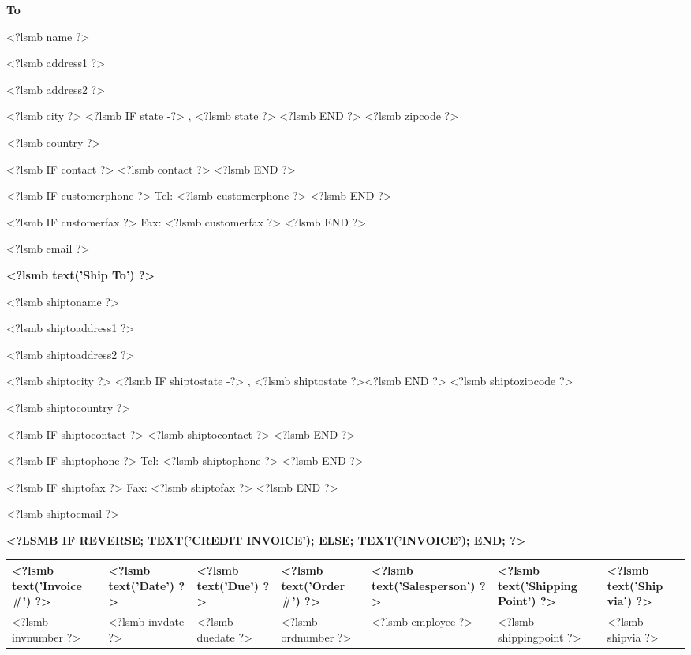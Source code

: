 \parbox[t]{.5\textwidth}{
\textbf{To}
\vspace{0.3cm}

<?lsmb name ?>

<?lsmb address1 ?>

<?lsmb address2 ?>

<?lsmb city ?>
<?lsmb IF state -?>
\hspace{-0.1cm}, <?lsmb state ?> <?lsmb END ?> <?lsmb zipcode ?>

<?lsmb country ?>

\vspace{0.3cm}

<?lsmb IF contact ?>
<?lsmb contact ?>
\vspace{0.2cm}
<?lsmb END ?>

<?lsmb IF customerphone ?>
Tel: <?lsmb customerphone ?>
<?lsmb END ?>

<?lsmb IF customerfax ?>
Fax: <?lsmb customerfax ?>
<?lsmb END ?>

<?lsmb email ?>
}
\parbox[t]{.5\textwidth}{
\textbf{<?lsmb text('Ship To') ?>}
\vspace{0.3cm}

<?lsmb shiptoname ?>

<?lsmb shiptoaddress1 ?>

<?lsmb shiptoaddress2 ?>

<?lsmb shiptocity ?>
<?lsmb IF shiptostate -?>
\hspace{-0.1cm}, <?lsmb shiptostate ?><?lsmb END ?> <?lsmb shiptozipcode ?>

<?lsmb shiptocountry ?>

\vspace{0.3cm}

<?lsmb IF shiptocontact ?>
<?lsmb shiptocontact ?>
\vspace{0.2cm}
<?lsmb END ?>

<?lsmb IF shiptophone ?>
Tel: <?lsmb shiptophone ?>
<?lsmb END ?>

<?lsmb IF shiptofax ?>
Fax: <?lsmb shiptofax ?>
<?lsmb END ?>

<?lsmb shiptoemail ?>
}
\hfill

\vspace{1cm}

\textbf{\MakeUppercase{<?lsmb
    IF reverse;
       text('Credit Invoice');
    ELSE;
       text('Invoice');
    END; ?>}}
\hfill

\vspace{1cm}

\begin{tabularx}{\textwidth}{*{7}{|X}|} \hline
  \textbf{<?lsmb text('Invoice #') ?>} & \textbf{<?lsmb text('Date') ?>} 
      & \textbf{<?lsmb text('Due') ?>} & \textbf{<?lsmb text('Order #') ?>}
      & \textbf{<?lsmb text('Salesperson') ?>} 
      & \textbf{<?lsmb text('Shipping Point') ?>} 
      & \textbf{<?lsmb text('Ship via') ?>} \\ [0.5em]
  \hline
  <?lsmb invnumber ?> & <?lsmb invdate ?> & <?lsmb duedate ?> & <?lsmb ordnumber ?> & <?lsmb employee ?>
  & <?lsmb shippingpoint ?> & <?lsmb shipvia ?> \\
  \hline
\end{tabularx}

